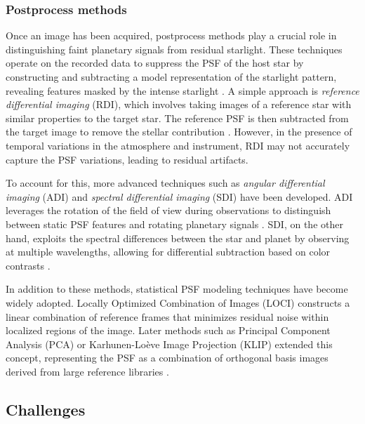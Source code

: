 \documentclass[preprint,longauthor]{aastex631}
\numberwithin{equation}{section}
\begin{document}
\subsubsection{Postprocess methods}

Once an image has been acquired, postprocess methods play a crucial role in distinguishing faint planetary signals from residual starlight. These techniques operate on the recorded data to suppress the PSF of the host star by constructing and subtracting a model representation of the starlight pattern, revealing features masked by the intense starlight \citep{lafreniereNewAlgorithmPoint2007}. A simple approach is \textit{reference differential imaging} (RDI), which involves taking images of a reference star with similar properties to the target star. The reference PSF is then subtracted from the target image to remove the stellar contribution \citep{folletteIntroductionHighContrast2023}. However, in the presence of temporal variations in the atmosphere and instrument, RDI may not accurately capture the PSF variations, leading to residual artifacts.

To account for this, more advanced techniques such as \textit{angular differential imaging} (ADI) and \textit{spectral differential imaging} (SDI) have been developed. ADI leverages the rotation of the field of view during observations to distinguish between static PSF features and rotating planetary signals \citep{maroisAngularDifferentialImaging2006}. SDI, on the other hand, exploits the spectral differences between the star and planet by observing at multiple wavelengths, allowing for differential subtraction based on color contrasts \citep{folletteIntroductionHighContrast2023}.

In addition to these methods, statistical PSF modeling techniques have become widely adopted. Locally Optimized Combination of Images (LOCI) \citep{lafreniereNewAlgorithmPoint2007} constructs a linear combination of reference frames that minimizes residual noise within localized regions of the image. Later methods such as Principal Component Analysis (PCA) or Karhunen-Loève Image Projection (KLIP) extended this concept, representing the PSF as a combination of orthogonal basis images derived from large reference libraries \citep{folletteIntroductionHighContrast2023}.

\subsection{Challenges}
\end{document}
